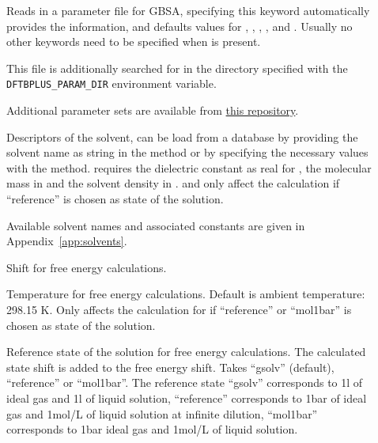 \begin{description}
  \item[] Reads in a parameter file for GBSA, specifying this
    keyword automatically provides the  information, and defaults
    values for , , , 
    ,  and .
    Usually no other keywords need to be specified when  is present.

    This file is additionally searched for in the directory specified with the
    \texttt{DFTBPLUS\_PARAM\_DIR} environment variable.

    Additional parameter sets are available from
    \href{https://github.com/grimme-lab/gbsa-parameters}{this
      repository}.

  \item[] Descriptors of the solvent, can be load from a database
    by providing the solvent name as string in the  method or
    by specifying the necessary values with the  method.
     requires the dielectric constant as real for ,
    the molecular mass in   and the
    solvent density in  .
     and  only affect the calculation if
    ``reference'' is chosen as state of the solution.

    Available solvent names and associated constants are given in Appendix~\ref{app:solvents}.

  \item[]  Shift for free energy
    calculations.

  \item[] Temperature for free energy calculations. Default is
    ambient temperature: 298.15 K.
    Only affects the calculation for if ``reference'' or ``mol1bar'' is chosen
    as state of the solution.

  \item[] 
    Reference state of the solution for free energy calculations.
    The calculated state shift is added to the free energy shift.
    Takes ``gsolv'' (default), ``reference'' or ``mol1bar''.
    The reference state ``gsolv'' corresponds to 1\;l of ideal gas and 1\;l of
    liquid  solution,
    ``reference'' corresponds to 1\;bar of ideal gas and 1\;mol/L of liquid
    solution at infinite dilution,
    ``mol1bar'' corresponds to 1\;bar ideal gas and 1\;mol/L of liquid solution.


\end{description}
